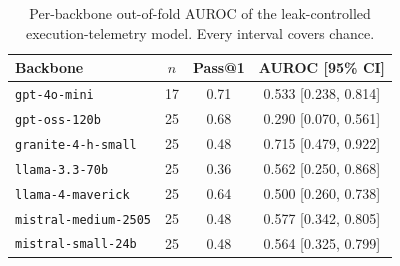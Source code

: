\begin{table}[t]
\centering
\caption{Per-backbone out-of-fold AUROC of the leak-controlled execution-telemetry model. Every interval covers chance.}
\label{tab:perbackbone}
\footnotesize
\begin{tabular}{lccc}
\toprule
\textbf{Backbone} & $n$ & \textbf{Pass@1} & \textbf{AUROC [95\% CI]} \\
\midrule
\texttt{gpt-4o-mini} & 17 & 0.71 & 0.533 [0.238, 0.814] \\
\texttt{gpt-oss-120b} & 25 & 0.68 & 0.290 [0.070, 0.561] \\
\texttt{granite-4-h-small} & 25 & 0.48 & 0.715 [0.479, 0.922] \\
\texttt{llama-3.3-70b} & 25 & 0.36 & 0.562 [0.250, 0.868] \\
\texttt{llama-4-maverick} & 25 & 0.64 & 0.500 [0.260, 0.738] \\
\texttt{mistral-medium-2505} & 25 & 0.48 & 0.577 [0.342, 0.805] \\
\texttt{mistral-small-24b} & 25 & 0.48 & 0.564 [0.325, 0.799] \\
\bottomrule
\end{tabular}
\end{table}
